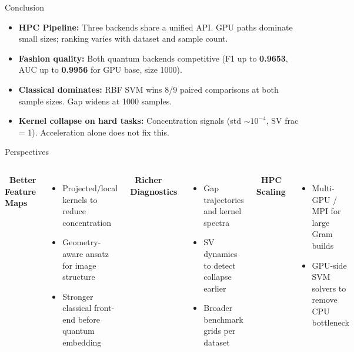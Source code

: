 \documentclass[10pt, aspectratio=169]{beamer}
\begin{document}
\begin{frame}{Conclusion}
    \begin{itemize}
        \setlength\itemsep{0.85em}
        \item[\faCheckCircle] \textbf{HPC Pipeline:} Three backends share a unified API. GPU paths dominate small sizes; ranking varies with dataset and sample count.
        \item[\faChartLine] \textbf{Fashion quality:} Both quantum backends competitive (F1 up to \textbf{0.9653}, AUC up to \textbf{0.9956} for GPU base, size 1000).
        \item[\faExclamationCircle] \textbf{Classical dominates:} RBF SVM wins 8/9 paired comparisons at both sample sizes. Gap widens at 1000 samples.
        \item[\faBan] \textbf{Kernel collapse on hard tasks:} Concentration signals (std $\sim 10^{-4}$, SV frac = 1). Acceleration alone does not fix this.
    \end{itemize}
\end{frame}

\begin{frame}{Perspectives}
    \begin{columns}[T,onlytextwidth]
        \textbf{\faArrowRight\ Better Feature Maps}
        \begin{itemize}
            \item Projected/local kernels to reduce concentration
            \item Geometry-aware ansatz for image structure
            \item Stronger classical front-end before quantum embedding
        \end{itemize}
        \vspace{0.3cm}
        \textbf{\faArrowRight\ Richer Diagnostics}
        \begin{itemize}
            \item Gap trajectories and kernel spectra
            \item SV dynamics to detect collapse earlier
            \item Broader benchmark grids per dataset
        \end{itemize}
        \textbf{\faArrowRight\ HPC Scaling}
        \begin{itemize}
            \item Multi-GPU / MPI for large Gram builds
            \item GPU-side SVM solvers to remove CPU bottleneck
        \end{itemize}
    \end{columns}
\end{frame}
\end{document}
